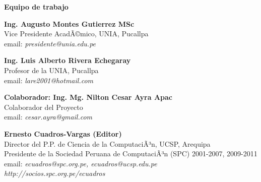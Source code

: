\begin{center}
{\bf \Huge Equipo de trabajo}
\end{center}
\vspace{1cm}

\begin{center}
\textbf{Ing. Augusto Montes Gutierrez MSc}\\
Vice Presidente AcadÃ©mico, UNIA, Pucallpa\\
email: \textit{presidente@unia.edu.pe}
\end{center}

\begin{center}
\textbf{Ing. Luis Alberto Rivera Echegaray}\\
Profesor de la UNIA, Pucallpa\\
email: \textit{lare2001@hotmail.com}
\end{center}

\begin{center}
\textbf{Colaborador: Ing. Mg. Nilton Cesar Ayra Apac}\\
Colaborador del Proyecto\\
email: \textit{cesar.ayra@gmail.com}
\end{center}

\begin{center}
\textbf{Ernesto Cuadros-Vargas (Editor)}\\
Director del P.P. de Ciencia de la ComputaciÃ³n, UCSP, Arequipa\\
Presidente de la Sociedad Peruana de ComputaciÃ³n (SPC) 2001-2007, 2009-2011\\
email: \textit{ecuadros@spc.org.pe, ecuadros@ucsp.edu.pe}\\
\textit{http://socios.spc.org.pe/ecuadros}
\end{center}

\newpage
